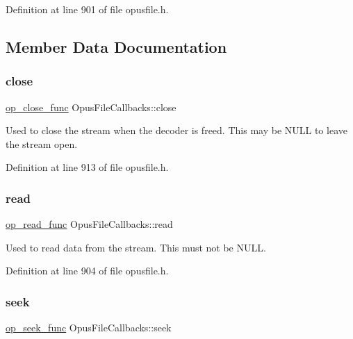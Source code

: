 Definition at line 901 of file opusfile.\+h.



\subsection{Member Data Documentation}
\mbox{\label{struct_opus_file_callbacks_a04548cff8eda8ab0322f47cb702fe889}} 
\subsubsection{\texorpdfstring{close}{close}}
{\footnotesize\ttfamily \mbox{\hyperlink{group__stream__callbacks_ga16c914ec90d301f125cdbeaa1ff57c2d}{op\+\_\+close\+\_\+func}} Opus\+File\+Callbacks\+::close}

Used to close the stream when the decoder is freed. This may be {\ttfamily N\+U\+LL} to leave the stream open. 

Definition at line 913 of file opusfile.\+h.

\mbox{\label{struct_opus_file_callbacks_a602ea09a84743a8f4fdc76ab7c0b6ee6}} 
\subsubsection{\texorpdfstring{read}{read}}
{\footnotesize\ttfamily \mbox{\hyperlink{group__stream__callbacks_ga9ffca429db1f3b77f2f303f1942188c3}{op\+\_\+read\+\_\+func}} Opus\+File\+Callbacks\+::read}

Used to read data from the stream. This must not be {\ttfamily N\+U\+LL}. 

Definition at line 904 of file opusfile.\+h.

\mbox{\label{struct_opus_file_callbacks_acf98bb1d13f75d3770206a398be05c8f}} 
\subsubsection{\texorpdfstring{seek}{seek}}
{\footnotesize\ttfamily \mbox{\hyperlink{group__stream__callbacks_gae57cb396d1f193d3f4e7e56ddad7760e}{op\+\_\+seek\+\_\+func}} Opus\+File\+Callbacks\+::seek}

